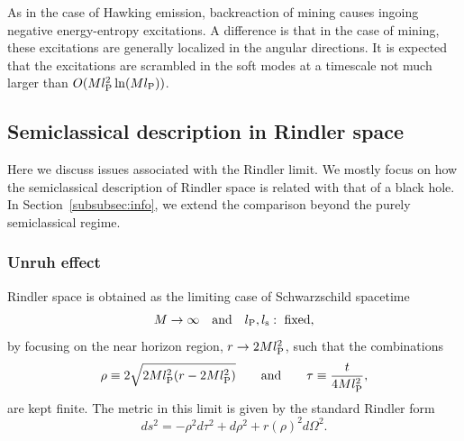 \documentclass[12pt]{article}
\begin{document}
As in the case of Hawking emission, backreaction of mining causes 
ingoing negative energy-entropy excitations.  A difference is that 
in the case of mining, these excitations are generally localized 
in the angular directions.  It is expected that the excitations 
are scrambled in the soft modes at a timescale not much larger than 
$O(M l_{\rm P}^2 \ln(M l_{\rm P}))$.


\subsection{Semiclassical description in Rindler space}
\label{subsec:sc-Rindler}

Here we discuss issues associated with the Rindler limit.  We mostly 
focus on how the semiclassical description of Rindler space is 
related with that of a black hole.  In Section~\ref{subsubsec:info}, 
we extend the comparison beyond the purely semiclassical regime.

\subsubsection{Unruh effect}
\label{subsubsec:Unruh}

Rindler space is obtained as the limiting case of Schwarzschild 
spacetime
%
\begin{equation}
  M \rightarrow \infty
\quad\mbox{and}\quad
  l_{\rm P}, l_{\rm s}: \mbox{ fixed},
\label{eq:Rind-limit}
\end{equation}
%
by focusing on the near horizon region, $r \rightarrow 
2Ml_{\rm P}^2$, such that the combinations
%
\begin{equation}
  \rho \equiv 2\sqrt{2Ml_{\rm P}^2(r-2Ml_{\rm P}^2)}
\qquad\mbox{and}\qquad
  \tau \equiv \frac{t}{4Ml_{\rm P}^2},
\label{eq:rho-omega}
\end{equation}
%
are kept finite.  The metric in this limit is given by the standard 
Rindler form
%
\begin{equation}
  ds^2 = -\rho^2 d\tau^2 + d\rho^2 + r(\rho)^2 d\Omega^2.
\label{eq:Rindler}
\end{equation}
%
\end{document}
